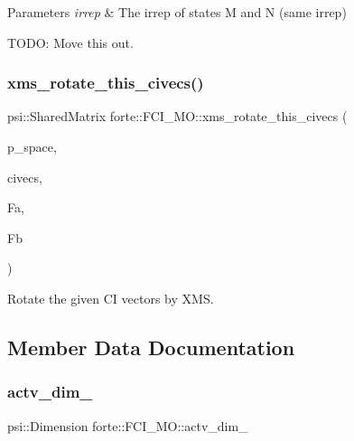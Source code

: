 \begin{DoxyParams}{Parameters}
{\em irrep} & The irrep of states M and N (same irrep) \\
\hline
\end{DoxyParams}
T\+O\+DO\+: Move this out. \mbox{\label{classforte_1_1_f_c_i___m_o_a4388651961800c7c43a102e97ef927f8}} 
\subsubsection{\texorpdfstring{xms\+\_\+rotate\+\_\+this\+\_\+civecs()}{xms\_rotate\_this\_civecs()}}
{\footnotesize\ttfamily psi\+::\+Shared\+Matrix forte\+::\+F\+C\+I\+\_\+\+M\+O\+::xms\+\_\+rotate\+\_\+this\+\_\+civecs (\begin{DoxyParamCaption}\item[{const \mbox{\hyperlink{namespaceforte_a2957b68e47fded14fd14ef47796ed751}{det\+\_\+vec}} \&}]{p\+\_\+space,  }\item[{psi\+::\+Shared\+Matrix}]{civecs,  }\item[{ambit\+::\+Tensor}]{Fa,  }\item[{ambit\+::\+Tensor}]{Fb }\end{DoxyParamCaption})\hspace{0.3cm}{\ttfamily [protected]}}



Rotate the given CI vectors by X\+MS. 



\subsection{Member Data Documentation}
\mbox{\label{classforte_1_1_f_c_i___m_o_a197b0110e1dc2a6edb763a9167a5174b}} 
\subsubsection{\texorpdfstring{actv\+\_\+dim\+\_\+}{actv\_dim\_}}
{\footnotesize\ttfamily psi\+::\+Dimension forte\+::\+F\+C\+I\+\_\+\+M\+O\+::actv\+\_\+dim\+\_\+\hspace{0.3cm}{\ttfamily [protected]}}

